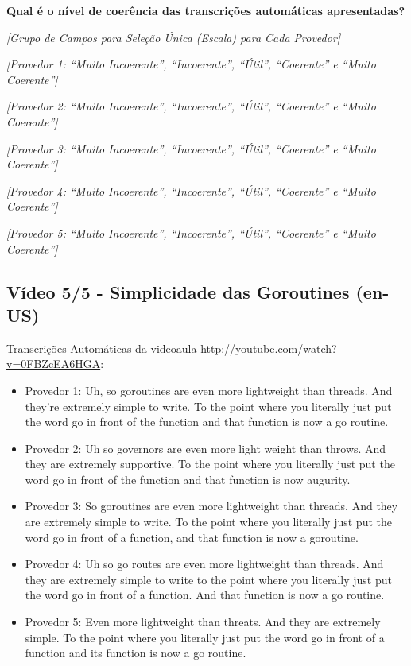 \noindent
\textbf{Qual é o nível de coerência das transcrições automáticas apresentadas?}

\noindent
\textit{[Grupo de Campos para Seleção Única (Escala) para Cada Provedor]}

\noindent
\textit{[Provedor 1: ``Muito Incoerente'', ``Incoerente'', ``Útil'', ``Coerente'' e ``Muito Coerente'']}

\noindent
\textit{[Provedor 2: ``Muito Incoerente'', ``Incoerente'', ``Útil'', ``Coerente'' e ``Muito Coerente'']}

\noindent
\textit{[Provedor 3: ``Muito Incoerente'', ``Incoerente'', ``Útil'', ``Coerente'' e ``Muito Coerente'']}

\noindent
\textit{[Provedor 4: ``Muito Incoerente'', ``Incoerente'', ``Útil'', ``Coerente'' e ``Muito Coerente'']}

\noindent
\textit{[Provedor 5: ``Muito Incoerente'', ``Incoerente'', ``Útil'', ``Coerente'' e ``Muito Coerente'']}

\subsection{Vídeo 5/5 - Simplicidade das Goroutines (en-US)}

\noindent
Transcrições Automáticas da videoaula \url{http://youtube.com/watch?v=0FBZcEA6HGA}:

\begin{itemize}
    \item Provedor 1: Uh, so goroutines are even more lightweight than threads. And they're extremely simple to write. To the point where you literally just put the word go in front of the function and that function is now a go routine.
    \item Provedor 2: Uh so governors are even more light weight than throws. And they are extremely supportive. To the point where you literally just put the word go in front of the function and that function is now augurity.
    \item Provedor 3: So goroutines are even more lightweight than threads. And they are extremely simple to write. To the point where you literally just put the word go in front of a function, and that function is now a goroutine.
    \item Provedor 4: Uh so go routes are even more lightweight than threads. And they are extremely simple to write to the point where you literally just put the word go in front of a function. And that function is now a go routine.
    \item Provedor 5: Even more lightweight than threats. And they are extremely simple. To the point where you literally just put the word go in front of a function and its function is now a go routine.
\end{itemize}

